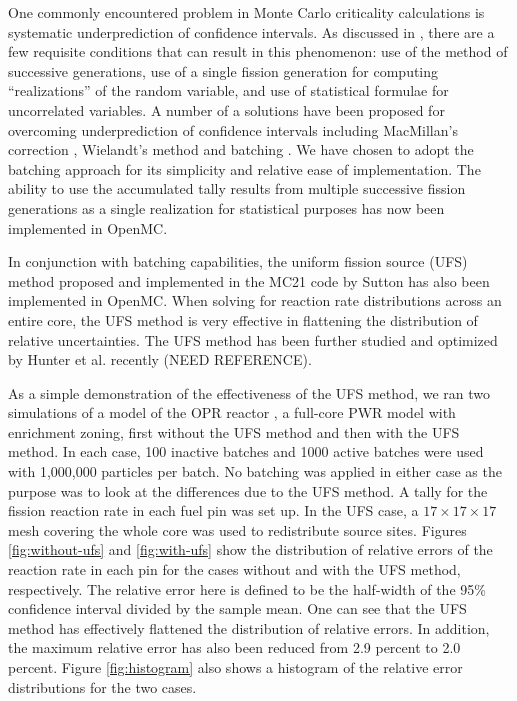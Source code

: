 \documentclass{ansconf}
\begin{document}
One commonly encountered problem in Monte Carlo criticality calculations is
systematic underprediction of confidence intervals. As discussed in
\cite{physor-kelly-2012}, there are a few requisite conditions that can result
in this phenomenon: use of the method of successive generations, use of a single
fission generation for computing ``realizations'' of the random variable, and
use of statistical formulae for uncorrelated variables. A number of a solutions
have been proposed for overcoming underprediction of confidence intervals
including MacMillan's correction \cite{nse-macmillan-1973}, Wielandt's method
\cite{trans-kiedrowski-2008} and batching \cite{physor-kelly-2012}. We have
chosen to adopt the batching approach for its simplicity and relative ease of
implementation. The ability to use the accumulated tally results from multiple
successive fission generations as a single realization for statistical purposes
has now been implemented in OpenMC.

In conjunction with batching capabilities, the uniform fission source (UFS)
method proposed and implemented in the MC21 code by Sutton
\cite{physor-kelly-2012} has also been implemented in OpenMC. When solving for
reaction rate distributions across an entire core, the UFS method is very
effective in flattening the distribution of relative uncertainties. The UFS
method has been further studied and optimized by Hunter et al. recently (NEED
REFERENCE).

As a simple demonstration of the effectiveness of the UFS method, we ran two
simulations of a model of the OPR reactor \cite{physor-lee-2012}, a full-core
PWR model with enrichment zoning, first without the UFS method and then with the
UFS method. In each case, 100 inactive batches and 1000 active batches were used
with 1,000,000 particles per batch. No batching was applied in either case as
the purpose was to look at the differences due to the UFS method. A tally for
the fission reaction rate in each fuel pin was set up. In the UFS case, a $17
\times 17 \times 17$ mesh covering the whole core was used to redistribute
source sites. Figures \ref{fig:without-ufs} and \ref{fig:with-ufs} show the
distribution of relative errors of the reaction rate in each pin for the cases
without and with the UFS method, respectively. The relative error here is
defined to be the half-width of the 95\% confidence interval divided by the
sample mean. One can see that the UFS method has effectively flattened the
distribution of relative errors. In addition, the maximum relative error has
also been reduced from 2.9 percent to 2.0 percent. Figure \ref{fig:histogram}
also shows a histogram of the relative error distributions for the two cases.
\end{document}
